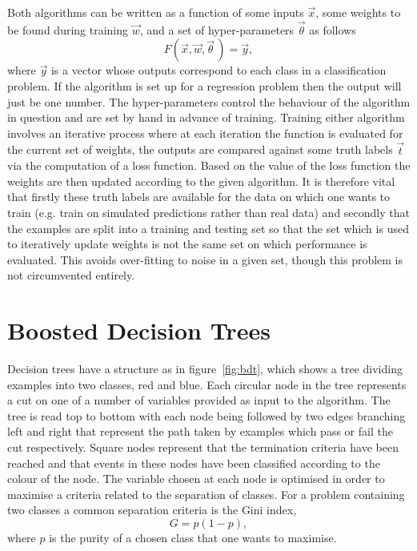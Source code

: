 Both algorithms can be written as a function of some inputs $\vec{x}$, some
weights to be found during training $\vec{w}$, and a set of hyper-parameters
$\vec{\theta}$ as follows
\begin{equation}
  F(\vec{x}, \vec{w}, \vec{\theta} \,) = \vec{y},
  \label{eq:ml-general}
\end{equation}
where $\vec{y}$ is a vector whose outputs correspond to each class in a
classification problem. If the algorithm is set up for a regression problem then
the output will just be one number. The hyper-parameters control the behaviour
of the algorithm in question and are set by hand in advance of training.
Training either algorithm involves an iterative process where at each iteration
the function is evaluated for the current set of weights, the outputs are
compared against some truth labels $\vec{t}$ via the computation of a loss
function. Based on the value of the loss function the weights are then updated
according to the given algorithm. It is therefore vital that firstly these truth
labels are available for the data on which one wants to train (e.g. train on
simulated predictions rather than real data) and secondly that the examples are
split into a training and testing set so that the set which is used to
iteratively update weights is not the same set on which performance is
evaluated. This avoids over-fitting to noise in a given set, though this
problem is not circumvented entirely.

\section{Boosted Decision Trees}%
\label{sec:bdts}
Decision trees have a structure as in figure~\ref{fig:bdt}, which shows a tree
dividing examples into two classes, red and blue.
 Each circular node in the tree represents a cut
on one of a number of variables provided as input to the algorithm. The tree is
read top to bottom with each node being followed by two edges branching left and
right that represent the path taken by examples which pass or fail the cut
respectively. Square nodes represent that the termination criteria have been
reached and that events in these nodes have been classified according to the
colour of the node. The variable chosen at each node is optimised in order to
maximise a criteria related to the separation of classes. For a problem
containing two classes a common separation criteria is the Gini index,
\begin{equation} G = p(1-p),
  \label{eq:gini}
\end{equation} where $p$ is the purity of a chosen class that one wants to
maximise.

